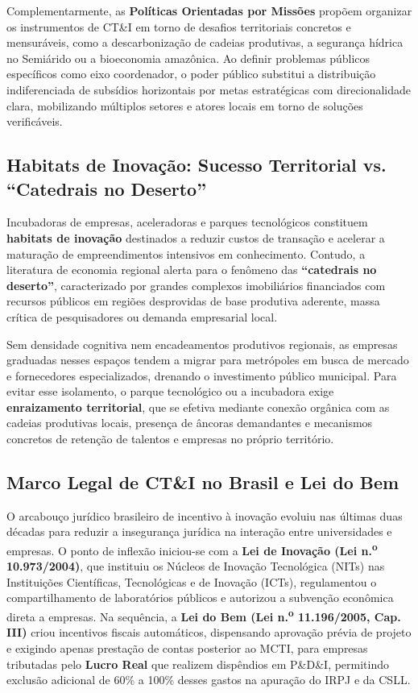 Complementarmente, as \textbf{Políticas Orientadas por Missões} propõem organizar os instrumentos de CT\&I em torno de desafios territoriais concretos e mensuráveis, como a descarbonização de cadeias produtivas, a segurança hídrica no Semiárido ou a bioeconomia amazônica. Ao definir problemas públicos específicos como eixo coordenador, o poder público substitui a distribuição indiferenciada de subsídios horizontais por metas estratégicas com direcionalidade clara, mobilizando múltiplos setores e atores locais em torno de soluções verificáveis.

\subsection{Habitats de Inovação: Sucesso Territorial vs. ``Catedrais no Deserto''}

Incubadoras de empresas, aceleradoras e parques tecnológicos constituem \textbf{habitats de inovação} destinados a reduzir custos de transação e acelerar a maturação de empreendimentos intensivos em conhecimento. Contudo, a literatura de economia regional alerta para o fenômeno das \textbf{``catedrais no deserto''}, caracterizado por grandes complexos imobiliários financiados com recursos públicos em regiões desprovidas de base produtiva aderente, massa crítica de pesquisadores ou demanda empresarial local.

Sem densidade cognitiva nem encadeamentos produtivos regionais, as empresas graduadas nesses espaços tendem a migrar para metrópoles em busca de mercado e fornecedores especializados, drenando o investimento público municipal. Para evitar esse isolamento, o parque tecnológico ou a incubadora exige \textbf{enraizamento territorial}, que se efetiva mediante conexão orgânica com as cadeias produtivas locais, presença de âncoras demandantes e mecanismos concretos de retenção de talentos e empresas no próprio território.

\subsection{Marco Legal de CT\&I no Brasil e Lei do Bem}

O arcabouço jurídico brasileiro de incentivo à inovação evoluiu nas últimas duas décadas para reduzir a insegurança jurídica na interação entre universidades e empresas. O ponto de inflexão iniciou-se com a \textbf{Lei de Inovação (Lei n.\textsuperscript{o} 10.973/2004)}, que instituiu os Núcleos de Inovação Tecnológica (NITs) nas Instituições Científicas, Tecnológicas e de Inovação (ICTs), regulamentou o compartilhamento de laboratórios públicos e autorizou a subvenção econômica direta a empresas. Na sequência, a \textbf{Lei do Bem (Lei n.\textsuperscript{o} 11.196/2005, Cap. III)} criou incentivos fiscais automáticos, dispensando aprovação prévia de projeto e exigindo apenas prestação de contas posterior ao MCTI, para empresas tributadas pelo \textbf{Lucro Real} que realizem dispêndios em P\&D\&I, permitindo exclusão adicional de 60\% a 100\% desses gastos na apuração do IRPJ e da CSLL.

